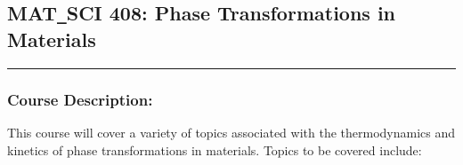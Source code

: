 	\subsection{MAT\texttt{\_}SCI 408: Phase Transformations in Materials}
	\vspace{-1em} \hfill \rule{0.4\textwidth}{.4pt}\newline
	\null \hfill {} \newline
	\null \hfill {}
\normalfont
		\subsubsection*{Course Description:}
This course will cover a variety of topics associated with the thermodynamics and kinetics of phase transformations in materials. Topics to be covered include:


